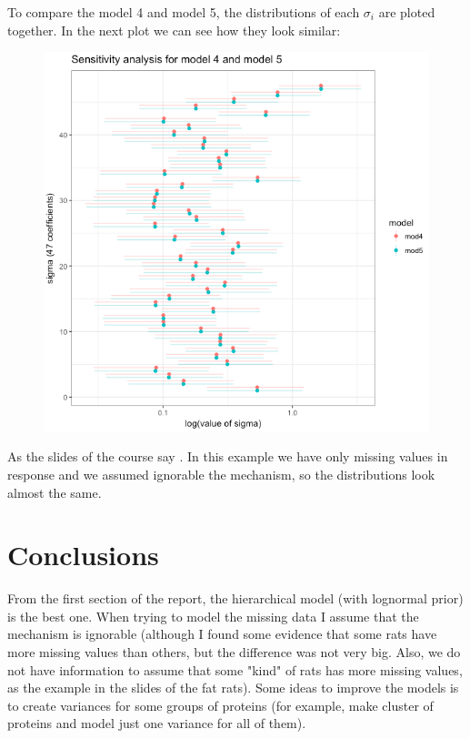 \documentclass{article}
\begin{document}
To compare the model 4 and model 5, the distributions of each $\sigma_i$ are ploted together. In the next plot we can see how they look similar:

\begin{figure}[ht!]
\centering
\includegraphics[width=12cm]{figures/model4_Sensitivity.png}
\end{figure}

As the slides of the course say . In this example we have only missing values in response and we assumed ignorable the mechanism, so the distributions look almost the same.


\section{Conclusions}
From the first section of the report, the hierarchical model (with lognormal prior) is the best one. When trying to model the missing data I assume that the mechanism is ignorable (although I found some evidence that some rats have more missing values than others, but the difference was not very big. Also, we do not have information to assume that some "kind" of rats has more missing values, as the example in the slides of the fat rats). Some ideas to improve the models is to create variances for some groups of proteins (for example, make cluster of proteins and model just one variance for all of them).
\end{document}
